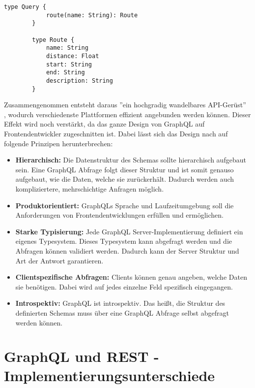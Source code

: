 \begin{lstlisting}[caption={Beispielstruktur eines Schemas},captionpos=b,label=lst:schema] 
        type Query {
            route(name: String): Route
        }

        type Route {
            name: String
            distance: Float
            start: String
            end: String
            description: String
        }
\end{lstlisting}

Zusammengenommen entsteht daraus ''ein hochgradig wandelbares API-Gerüst'' \\ \parencite{Ionos2019}, wodurch verschiedenste Plattformen effizient angebunden werden können. Dieser Effekt wird noch verstärkt, da das ganze Design von GraphQL auf Frontendentwickler zugeschnitten ist. Dabei lässt sich das Design nach \parencite{GraphQL2018} auf folgende Prinzipen herunterbrechen: 

\begin{itemize}
\item \textbf{Hierarchisch:} Die Datenstruktur des Schemas sollte hierarchisch aufgebaut sein. Eine GraphQL Abfrage folgt dieser Struktur und ist somit genauso aufgebaut, wie die Daten, welche sie zurückerhält. Dadurch werden auch kompliziertere, mehrschichtige Anfragen möglich.
\item \textbf{Produktorientiert:} GraphQLs Sprache und Laufzeitumgebung soll die Anforderungen von Frontendentwicklungen erfüllen und ermöglichen.
\item \textbf{Starke Typisierung:} Jede GraphQL Server-Implementierung definiert ein eigenes Typesystem. Dieses Typesystem kann abgefragt werden und die Abfragen können validiert werden. Dadurch kann der Server Struktur und Art der Antwort garantieren.
\item \textbf{Clientspezifische Abfragen:} Clients können genau angeben, welche Daten sie benötigen. Dabei wird auf jedes einzelne Feld spezifisch eingegangen.
\item \textbf{Introspektiv:} GraphQL ist introspektiv. Das heißt, die Struktur des definierten Schemas muss über eine GraphQL Abfrage selbst abgefragt werden können.
\end{itemize}

\section{GraphQL und REST - Implementierungsunterschiede}

